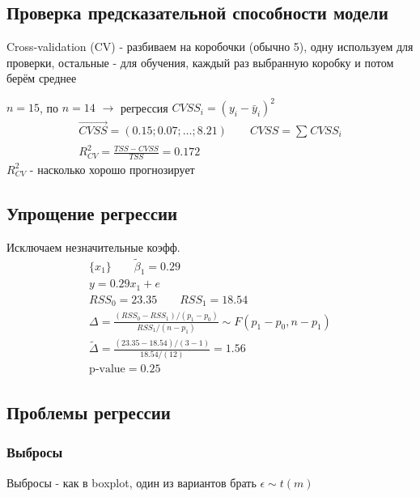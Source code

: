 \documentclass{article}
\begin{document}
\subsection{Проверка предсказательной способности модели}
Cross-validation (CV) - разбиваем на коробочки (обычно 5), одну используем для проверки,
остальные - для обучения, каждый раз выбранную коробку и потом берём среднее
\begin{eg}
  $n=15$, по $n = 14$ $\rightarrow$ регрессия $CVSS_i=(y_i - \bar{y}_i)^{2}$
  \begin{gather*}
    \vec{CVSS}=(0.15;0.07; \dots ; 8.21) \qquad CVSS=\sum_{}^{}CVSS_i \\ 
    R^{2}_{CV}=\frac{TSS-CVSS}{TSS}=0.172
  \end{gather*}
  $R^{2}_{CV}$ - насколько хорошо прогнозирует
\end{eg}
\subsection{Упрощение регрессии}
Исключаем незначительные коэфф.
\begin{gather*}
  \{x_1\} \qquad \tilde{\beta}_1=0.29 \\ 
  y=0.29x_1 + e \\ 
  RSS_0=23.35 \qquad RSS_1=18.54 \\
  \Delta=\frac{(RSS_0-RSS_1)/(p_1-p_0)}{RSS_1/(n-p_1)} \sim F(p_1-p_0, n-p_1) \\ 
  \tilde{\Delta} = \frac{(23.35-18.54)/(3-1)}{18.54 / (12)} = 1.56 \\ 
  \text{p-value} = 0.25 
\end{gather*}


\subsection{Проблемы регрессии}
\subsubsection{Выбросы}
Выбросы - как в boxplot, один из вариантов брать $\epsilon \sim t(m)$
\end{document}
